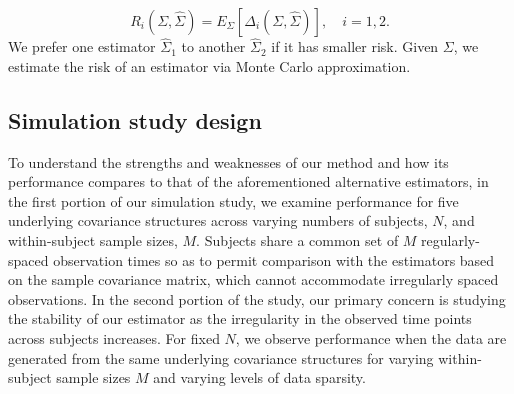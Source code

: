 \documentclass[12pt]{article}
\theoremstyle{definition}
\begin{document}
\begin{equation*}
R_i \left(\Sigma,\hat{\Sigma}\right) = E_\Sigma\left[\Delta_i\left(\Sigma,\hat{\Sigma}\right)\right], \quad i = 1,2.
\end{equation*}
\noindent
We prefer one estimator $\hat{\Sigma}_1$ to another $\hat{\Sigma}_2$ if it has smaller risk.  Given $\Sigma$, we estimate the risk of an estimator via Monte Carlo approximation. 

\subsection{Simulation study design}
To understand the strengths and weaknesses of our method and how its performance compares to that of the aforementioned alternative estimators, in the first portion of our simulation study, we examine performance for five underlying covariance structures across varying numbers of subjects, $N$, and within-subject sample sizes, $M$. Subjects share a common set of $M$ regularly-spaced observation times so as to permit comparison with the estimators based on the sample covariance matrix, which cannot accommodate irregularly spaced observations.  In the second portion of the study, our primary concern is studying the stability of our estimator as the irregularity in the observed time points across subjects increases. For fixed $N$, we observe performance when the data are generated from the same underlying covariance structures for varying within-subject sample sizes $M$ and varying levels of data sparsity. 
\end{document}
